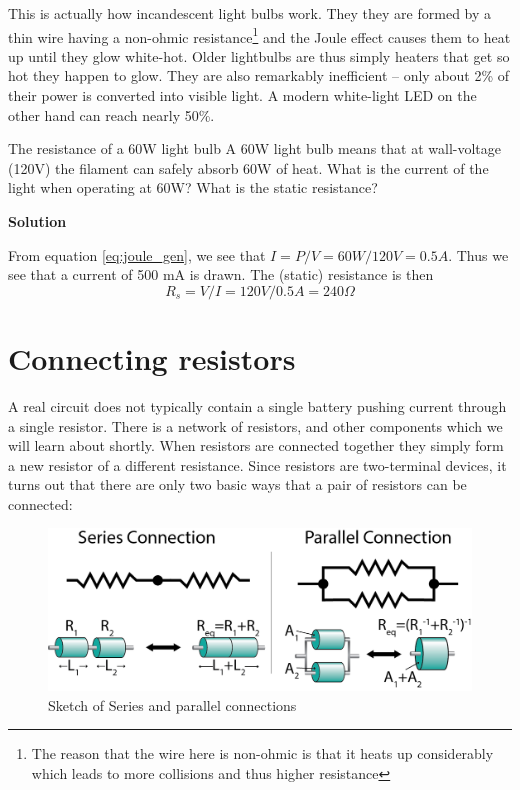 \documentclass{tufte-book}
\newcommand\Solution{\par\textbf{\textsf{Solution}}\par\medskip}
\begin{document}
This is actually how incandescent light bulbs work. They they are formed by a thin wire having a non-ohmic resistance\footnote{The reason that the wire here is non-ohmic is that it heats up considerably which leads to more collisions and thus higher resistance} and the Joule effect causes them to heat up until they glow white-hot. Older lightbulbs are thus simply heaters that get so hot they happen to glow. They are also remarkably inefficient -- only about 2\% of their power is converted into visible light. A modern white-light LED on the other hand can reach nearly 50\%.



\begin{myexample}[label = ex:res_lightbulb]{The resistance of a 60W light bulb}
A 60W light bulb means that at wall-voltage (120V) the filament can safely absorb 60W of heat. What is the current of the light when operating at 60W? What is the static resistance?
\Solution %
From equation \ref{eq:joule_gen}, we see that $I = P/V = 60W/120V = 0.5A$. Thus we see that a current of 500 mA is drawn. The (static) resistance is then 
$$
R_s = V/I = 120V/0.5A = 240 \Omega
$$
\end{myexample}







\section{Connecting resistors}
A real circuit does not typically contain a single battery pushing current through a single resistor. There is a network of resistors, and other components which we will learn about shortly. When resistors are connected together they simply form a new resistor of a different resistance. Since resistors are two-terminal devices, it turns out that there are only two basic ways that a pair of resistors can be connected:

\begin{figure}[h]
\caption{Sketch of Series and parallel connections}
\label{fig:res_series_parallel}
\begin{center}
\includegraphics[width=\textwidth]{res_series_parallel.png}
\end{center}
\end{figure}
\end{document}
